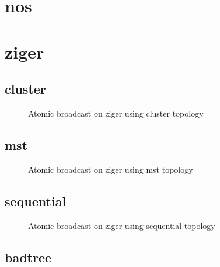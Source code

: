 \newpage\clearpage\section{nos}

\newpage\clearpage\section{ziger}

\subsection{cluster}

\begin{figure}[ht!]

\caption{Atomic broadcast on ziger using cluster topology}
\label{fig:ab_ziger_cluster}
\end{figure}
\clearpage\subsection{mst}

\begin{figure}[ht!]

\caption{Atomic broadcast on ziger using mst topology}
\label{fig:ab_ziger_mst}
\end{figure}
\clearpage\subsection{sequential}

\begin{figure}[ht!]

\caption{Atomic broadcast on ziger using sequential topology}
\label{fig:ab_ziger_sequential}
\end{figure}
\clearpage\subsection{badtree}

